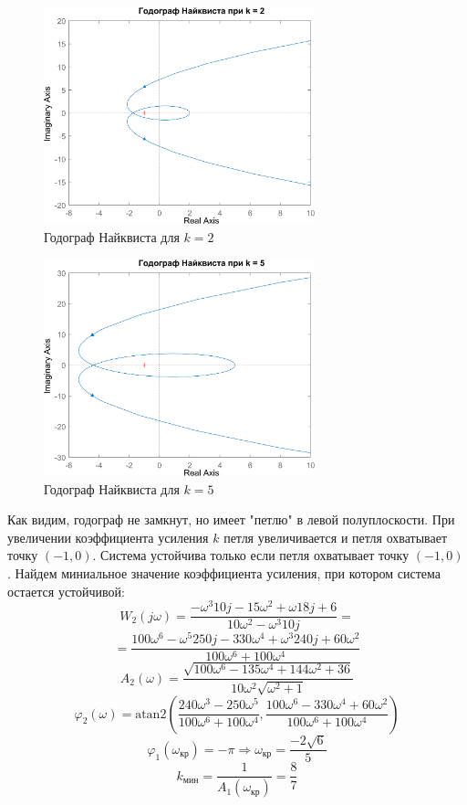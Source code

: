 \begin{figure}[H]
    \centering
    \centering
    \includegraphics[width=0.7\textwidth, trim={0cm 0cm 0cm 0cm}]{../images/2_2_2_hod.png}
    \caption{Годограф Найквиста для $k = 2$}
\end{figure}

\begin{figure}[H]
    \centering
    \centering
    \includegraphics[width=0.7\textwidth, trim={0cm 0cm 0cm 0cm}]{../images/2_2_3_hod.png}
    \caption{Годограф Найквиста для $k = 5$}
\end{figure}

Как видим, годограф не замкнут, но имеет "петлю" в левой полуплоскости. При увеличении коэффициента усиления $k$ петля увеличивается
и петля охватывает точку $(-1, 0)$. Система устойчива только если петля охватывает точку $(-1, 0)$. Найдем миниальное
значение коэффициента усиления, при котором система остается устойчивой:
\[
W_2(j\omega) = \frac{-\omega ^3 10j - 15\omega ^2 + \omega 18j + 6}{10\omega ^2 - \omega ^3 10j} =
\]
\[
= \frac{100\omega ^6 - \omega ^5 250j - 330\omega ^4 + \omega ^3 240j + 60\omega ^2}{100\omega ^6 + 100\omega ^4}
\]
\[
A_2(\omega) = \frac{\sqrt{100\omega ^6 - 135\omega ^4 + 144\omega ^2 + 36}}{10\omega ^2 \sqrt{\omega ^2 + 1}}
\]
\[
\varphi_2(\omega) = \mathrm{atan2}\left(\frac{240\omega ^3 - 250\omega ^5}{100\omega ^6 + 100\omega ^4}, \frac{100\omega ^6 - 330\omega ^4 + 60\omega ^2}{100\omega ^6 + 100\omega ^4}\right)
\]
\[
\varphi_1(\omega_{\text{кр}}) = -\pi \Rightarrow \omega_{\text{кр}} = \frac{-2\sqrt{6}}{5}
\]
\[
k_{\text{мин}} = \frac{1}{A_1(\omega_{\text{кр}})} = \frac{8}{7}
\]

